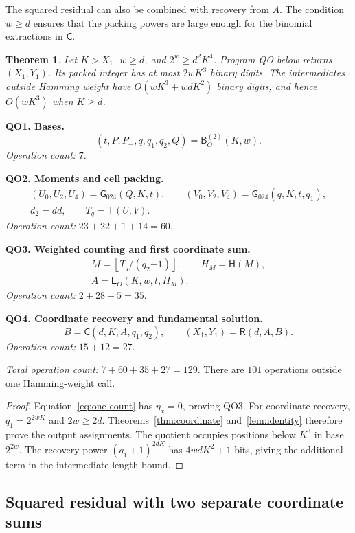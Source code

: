 \documentclass[11pt]{article}
\newtheorem{theorem}{Theorem}
\theoremstyle{remark}
\newcommand{\tsub}{\mathbin{\dot{-}}}
\newcommand{\fl}[1]{\left\lfloor #1\right\rfloor}
\newcommand{\Gtriple}{\mathsf{G}_{024}}
\newcommand{\Recover}{\mathsf{R}}
\newcommand{\Coord}{\mathsf{C}}
\newcommand{\Squared}{\mathsf{T}}
\begin{document}
The squared residual can also be combined with recovery from $A$.
The condition $w\ge d$ ensures that the packing powers are large
enough for the binomial extractions in $\Coord$.

\begin{theorem}\label{thm:qo}
Let $K>X_1$, $w\ge d$, and $2^w\ge d^2K^4$.
Program QO below returns $(X_1,Y_1)$.
Its packed integer has at most $2wK^3$ binary digits.
The intermediates outside Hamming weight have
$O(wK^3+wdK^2)$ binary digits, and hence $O(wK^3)$ when $K\ge d$.
\end{theorem}

\textbf{QO1. Bases.}
\[
  (t,P,P_-,q,q_1,q_2,Q)=\mathsf B_O^{(2)}(K,w).
\]
\emph{Operation count:} $7$.

\textbf{QO2. Moments and cell packing.}
\begin{gather*}
  (U_0,U_2,U_4)=\Gtriple(Q,K,t),\qquad
  (V_0,V_2,V_4)=\Gtriple(q,K,t,q_1),\\
  d_2=dd,\qquad T_q=\Squared(U,V).
\end{gather*}
\emph{Operation count:} $23+22+1+14=60$.

\textbf{QO3. Weighted counting and first coordinate sum.}
\begin{gather*}
  M=\fl{T_q/(q_2\tsub1)},\qquad H_M=\mathsf H(M),\\
  A=\mathsf E_O(K,w,t,H_M).
\end{gather*}
\emph{Operation count:} $2+28+5=35$.

\textbf{QO4. Coordinate recovery and fundamental solution.}
\[
  B=\Coord(d,K,A,q_1,q_2),\qquad (X_1,Y_1)=\Recover(d,A,B).
\]
\emph{Operation count:} $15+12=27$.

\emph{Total operation count:} $7+60+35+27=129$.
There are $101$ operations outside one Hamming-weight call.

\begin{proof}
Equation~\eqref{eq:one-count} has $\eta_x=0$, proving QO3.
For coordinate recovery, $q_1=2^{2wK}$ and $2w\ge2d$.
Theorems~\ref{thm:coordinate} and~\ref{lem:identity} therefore
prove the output assignments. The quotient occupies positions below
$K^3$ in base $2^{2w}$.
The recovery power $(q_1+1)^{2dK}$ has $4wdK^2+1$ bits, giving
the additional term in the intermediate-length bound.
\end{proof}

\subsection{Squared residual with two separate coordinate sums}\label{sec:qt}
\end{document}
